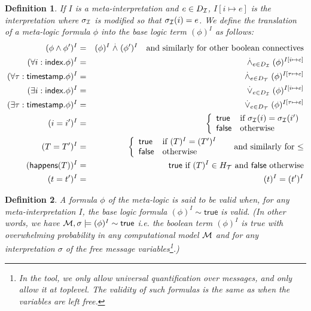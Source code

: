 \documentclass[a4paper]{article}
\newtheorem{definition}{Definition}
\theoremstyle{remark}
\begin{document}
\begin{definition}
  If $I$ is a meta-interpretation and $e\in D_{\mathcal{I}}$,
  $I[i\mapsto e]$ is the interpretation where $\sigma_{\mathcal{I}}$ is
  modified so that $\sigma_{\mathcal{I}}(i)=e$.
  We define the translation of a meta-logic formula $\phi$
  into the base logic \emph{term} $(\phi)^I$
  as follows:
  \begin{eqnarray*}
    (\phi\wedge\phi')^I &=& (\phi)^I \stackrel{.}{\wedge} (\phi')^I
    \quad \text{and similarly for other boolean connectives} \\
    (\forall i:\textsf{index}. \phi)^I &=&
    \stackrel{.}{\wedge}_{e\in D_{\mathcal{I}}} (\phi)^{I[i\mapsto e]} \\
    (\forall \tau:\textsf{timestamp}. \phi)^I &=&
    \stackrel{.}{\wedge}_{e\in D_{\mathcal{T}}} (\phi)^{I[\tau\mapsto e]} \\
    (\exists i:\textsf{index}. \phi)^I &=&
    \stackrel{.}{\vee}_{e\in D_{\mathcal{I}}} (\phi)^{I[i\mapsto e]} \\
    (\exists \tau:\textsf{timestamp}. \phi)^I &=&
    \stackrel{.}{\vee}_{e\in D_{\mathcal{T}}} (\phi)^{I[\tau\mapsto e]} \\
    (i=i')^I &=&
    \left\{\begin{array}{ll}
      \mathsf{true} & \text{if } \sigma_{\mathcal{I}}(i)=\sigma_{\mathcal{I}}(i') \\
      \mathsf{false} & \text{otherwise}
    \end{array}\right. \\
    (T = T')^I &=&
    \left\{\begin{array}{ll}
      \mathsf{true} & \text{if } (T)^I = (T')^I \\
      \mathsf{false} & \text{otherwise}
    \end{array}\right.
    \quad\text{ and similarly for $\leq$} \\
    (\textsf{happens}(T))^I &=& \mathsf{true}
    \text{ if } (T)^I \in H_{\mathcal{T}}
    \text{ and } \mathsf{false} \text{ otherwise}
    \\
    (t=t')^I &=& (t)^I = (t')^I
  \end{eqnarray*}
\end{definition}

\begin{definition}
  A formula $\phi$ of the meta-logic is said to be valid when,
  for any meta-interpretation $I$, the base logic formula
  $(\phi)^I \sim \mathsf{true}$ is valid.
  (In other words, we have $\mathcal{M},\sigma\models(\phi)^I\sim\mathsf{true}$
  i.e. the boolean term $(\phi)^I$ is true with overwhelming
  probability in any computational model $\mathcal{M}$ and for any interpretation
  $\sigma$ of the free message variables\footnote{
    In the tool, we only allow universal quantification over messages, and
  only allow it at toplevel. The validity of such formulas is the same as
  when the variables are left free.}.)
\end{definition}
\end{document}
